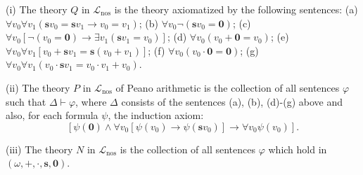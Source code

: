 (i) The theory $Q$ in $\mathcal{L}_{\text{nos}}$ is the theory axiomatized by the following sentences:
(a) $\forall v_0 \forall v_1 (\mathbf{s}v_0 = \mathbf{s}v_1 \rightarrow v_0 = v_1)$;
(b) $\forall v_0 \neg(\mathbf{s}v_0 = \mathbf{0})$;
(c) $\forall v_0 [\neg(v_0 = \mathbf{0}) \rightarrow \exists v_1(\mathbf{s}v_1 = v_0)]$;
(d) $\forall v_0(v_0 + \mathbf{0} = v_0)$;
(e) $\forall v_0 \forall v_1 [v_0 + \mathbf{s}v_1 = \mathbf{s}(v_0 + v_1)]$;
(f) $\forall v_0(v_0 \cdot \mathbf{0} = \mathbf{0})$;
(g) $\forall v_0 \forall v_1(v_0 \cdot \mathbf{s}v_1 = v_0 \cdot v_1 + v_0)$.

(ii) The theory $P$ in $\mathcal{L}_{\text{nos}}$ of Peano arithmetic is the collection of all sentences $\varphi$ such that $\Delta \vdash \varphi$, where $\Delta$ consists of the sentences (a), (b), (d)-(g) above and also, for each formula $\psi$, the induction axiom:
$$[\psi(\mathbf{0}) \land \forall v_0 [\psi(v_0) \rightarrow \psi(\mathbf{s}v_0)] \rightarrow \forall v_0 \psi(v_0)].$$

(iii) The theory $N$ in $\mathcal{L}_{\text{nos}}$ is the collection of all sentences $\varphi$ which hold in $(\omega, +, \cdot, \mathbf{s}, \mathbf{0})$.
